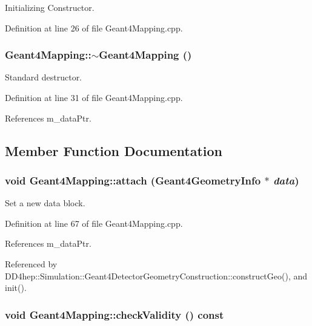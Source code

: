Initializing Constructor. 

Definition at line 26 of file Geant4Mapping.cpp.\hypertarget{class_d_d4hep_1_1_simulation_1_1_geant4_mapping_a497e1e6164765a418d66430d4d404708}{
\subsubsection[{$\sim$Geant4Mapping}]{\setlength{\rightskip}{0pt plus 5cm}Geant4Mapping::$\sim$Geant4Mapping ()}}
\label{class_d_d4hep_1_1_simulation_1_1_geant4_mapping_a497e1e6164765a418d66430d4d404708}


Standard destructor. 

Definition at line 31 of file Geant4Mapping.cpp.

References m\_\-dataPtr.

\subsection{Member Function Documentation}
\hypertarget{class_d_d4hep_1_1_simulation_1_1_geant4_mapping_a10366f0a203f866a02f9e550d7a9d950}{
\subsubsection[{attach}]{\setlength{\rightskip}{0pt plus 5cm}void Geant4Mapping::attach ({\bf Geant4GeometryInfo} $\ast$ {\em data})}}
\label{class_d_d4hep_1_1_simulation_1_1_geant4_mapping_a10366f0a203f866a02f9e550d7a9d950}


Set a new data block. 

Definition at line 67 of file Geant4Mapping.cpp.

References m\_\-dataPtr.

Referenced by DD4hep::Simulation::Geant4DetectorGeometryConstruction::constructGeo(), and init().\hypertarget{class_d_d4hep_1_1_simulation_1_1_geant4_mapping_ae2b4f0f0b1e035eb7ca8b220ff5c815a}{
\subsubsection[{checkValidity}]{\setlength{\rightskip}{0pt plus 5cm}void Geant4Mapping::checkValidity () const}}
\label{class_d_d4hep_1_1_simulation_1_1_geant4_mapping_ae2b4f0f0b1e035eb7ca8b220ff5c815a}


